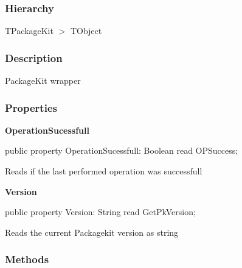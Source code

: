 \documentclass{report}
\newif\ifpdf
\begin{document}
\subsubsection*{\large{\textbf{Hierarchy}}\normalsize\hspace{1ex}\hfill}
TPackageKit {$>$} TObject
\subsubsection*{\large{\textbf{Description}}\normalsize\hspace{1ex}\hfill}
PackageKit wrapper\subsubsection*{\large{\textbf{Properties}}\normalsize\hspace{1ex}\hfill}
\begin{list}{}{
\setlength{\itemindent}{0cm}
\setlength{\listparindent}{0cm}
\setlength{\leftmargin}{\evensidemargin}
\addtolength{\leftmargin}{\tmplength}
\settowidth{\labelsep}{X}
\addtolength{\leftmargin}{\labelsep}
\setlength{\labelwidth}{\tmplength}
}
\label{packagekit.TPackageKit-OperationSucessfull}
\item[\textbf{OperationSucessfull}\hfill]
\ifpdf
\begin{flushleft}
\fi
\begin{ttfamily}
public property OperationSucessfull: Boolean read OPSuccess;\end{ttfamily}

\ifpdf
\end{flushleft}
\fi


\par Reads if the last performed operation was successfull\label{packagekit.TPackageKit-Version}
\item[\textbf{Version}\hfill]
\ifpdf
\begin{flushleft}
\fi
\begin{ttfamily}
public property Version: String read GetPkVersion;\end{ttfamily}

\ifpdf
\end{flushleft}
\fi


\par Reads the current Packagekit version as string\end{list}
\subsubsection*{\large{\textbf{Methods}}\normalsize\hspace{1ex}\hfill}
\end{document}
